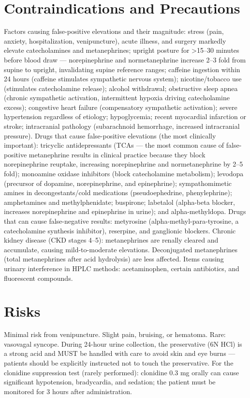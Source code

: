 \section*{Contraindications and Precautions}
Factors causing false-positive elevations and their magnitude: stress (pain, anxiety, hospitalization, venipuncture), acute illness, and surgery markedly elevate catecholamines and metanephrines; upright posture for >15--30 minutes before blood draw --- norepinephrine and normetanephrine increase 2--3 fold from supine to upright, invalidating supine reference ranges; caffeine ingestion within 24 hours (caffeine stimulates sympathetic nervous system); nicotine/tobacco use (stimulates catecholamine release); alcohol withdrawal; obstructive sleep apnea (chronic sympathetic activation, intermittent hypoxia driving catecholamine excess); congestive heart failure (compensatory sympathetic activation); severe hypertension regardless of etiology; hypoglycemia; recent myocardial infarction or stroke; intracranial pathology (subarachnoid hemorrhage, increased intracranial pressure). Drugs that cause false-positive elevations (the most clinically important): tricyclic antidepressants (TCAs --- the most common cause of false-positive metanephrine results in clinical practice because they block norepinephrine reuptake, increasing norepinephrine and normetanephrine by 2--5 fold); monoamine oxidase inhibitors (block catecholamine metabolism); levodopa (precursor of dopamine, norepinephrine, and epinephrine); sympathomimetic amines in decongestants/cold medications (pseudoephedrine, phenylephrine); amphetamines and methylphenidate; buspirone; labetalol (alpha-beta blocker, increases norepinephrine and epinephrine in urine); and alpha-methyldopa. Drugs that can cause false-negative results: metyrosine (alpha-methyl-para-tyrosine, a catecholamine synthesis inhibitor), reserpine, and ganglionic blockers. Chronic kidney disease (CKD stages 4--5): metanephrines are renally cleared and accumulate, causing mild-to-moderate elevations. Deconjugated metanephrines (total metanephrines after acid hydrolysis) are less affected. Items causing urinary interference in HPLC methods: acetaminophen, certain antibiotics, and fluorescent compounds.

\section*{Risks}
Minimal risk from venipuncture. Slight pain, bruising, or hematoma. Rare: vasovagal syncope. During 24-hour urine collection, the preservative (6N HCl) is a strong acid and MUST be handled with care to avoid skin and eye burns --- patients should be explicitly instructed not to touch the preservative. For the clonidine suppression test (rarely performed): clonidine 0.3 mg orally can cause significant hypotension, bradycardia, and sedation; the patient must be monitored for 3 hours after administration.

